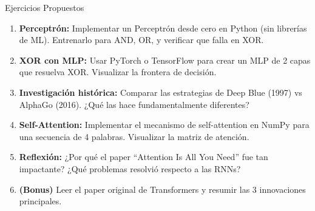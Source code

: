 \documentclass[aspectratio=169]{beamer}
\begin{document}
\begin{frame}{Ejercicios Propuestos}
    \begin{enumerate}
        \setlength\itemsep{0.5em}
        \item \textbf{Perceptrón:} Implementar un Perceptrón desde cero en Python (sin librerías de ML). Entrenarlo para AND, OR, y verificar que falla en XOR.
        
        \item \textbf{XOR con MLP:} Usar PyTorch o TensorFlow para crear un MLP de 2 capas que resuelva XOR. Visualizar la frontera de decisión.
        
        \item \textbf{Investigación histórica:} Comparar las estrategias de Deep Blue (1997) vs AlphaGo (2016). ¿Qué las hace fundamentalmente diferentes?
        
        \item \textbf{Self-Attention:} Implementar el mecanismo de self-attention en NumPy para una secuencia de 4 palabras. Visualizar la matriz de atención.
        
        \item \textbf{Reflexión:} ¿Por qué el paper ``Attention Is All You Need'' fue tan impactante? ¿Qué problemas resolvió respecto a las RNNs?
        
        \item \textbf{(Bonus)} Leer el paper original de Transformers y resumir las 3 innovaciones principales.
    \end{enumerate}
\end{frame}
\end{document}
